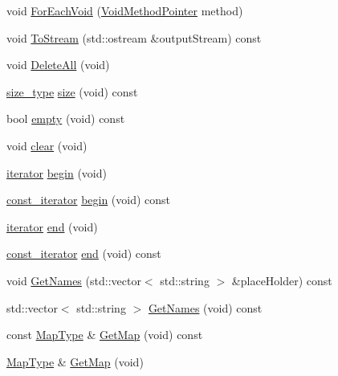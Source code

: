 \begin{DoxyCompactItemize}
\item 
void \hyperlink{classcmn_named_map_ae0a0c6bec0c43bd152aa29b396a7dccb}{For\-Each\-Void} (\hyperlink{classcmn_named_map_a00103a8e6e3c75f6eeabcc3a0657521c}{Void\-Method\-Pointer} method)
\item 
void \hyperlink{classcmn_named_map_a1082cdd551da4064ac01d1687bf91bf2}{To\-Stream} (std\-::ostream \&output\-Stream) const 
\item 
void \hyperlink{classcmn_named_map_a7b4699c7d3e7bcda36f0d5f3615a9594}{Delete\-All} (void)
\item 
\hyperlink{classcmn_named_map_aaaf5963f1e9b26efb08e7f0cd7199335}{size\-\_\-type} \hyperlink{classcmn_named_map_a5c545600ff58364bef71df804078378f}{size} (void) const 
\item 
bool \hyperlink{classcmn_named_map_a6f8ee322e0cef9aa6841dfe4e9b51b0b}{empty} (void) const 
\item 
void \hyperlink{classcmn_named_map_ab1bb56227b49802271d395b99af72bcb}{clear} (void)
\item 
\hyperlink{classcmn_named_map_a0ad463b349c3c95e8f639e12f492765e}{iterator} \hyperlink{classcmn_named_map_a1161a0e7eaaf2b34cd6747f29e9f52d7}{begin} (void)
\item 
\hyperlink{classcmn_named_map_a94a2be09d6678944e3a330c641d69d41}{const\-\_\-iterator} \hyperlink{classcmn_named_map_aefff0d0c751cf9fee634b95bd796abcd}{begin} (void) const 
\item 
\hyperlink{classcmn_named_map_a0ad463b349c3c95e8f639e12f492765e}{iterator} \hyperlink{classcmn_named_map_a593995b97e2051fb19a53ba3d27fd207}{end} (void)
\item 
\hyperlink{classcmn_named_map_a94a2be09d6678944e3a330c641d69d41}{const\-\_\-iterator} \hyperlink{classcmn_named_map_a5c0a21bb49e60dfd6c585ce3c3406bf4}{end} (void) const 
\end{DoxyCompactItemize}
{\bf }\par
\begin{DoxyCompactItemize}
\item 
void \hyperlink{classcmn_named_map_aa606927a1fb85df463d2148200923f40}{Get\-Names} (std\-::vector$<$ std\-::string $>$ \&place\-Holder) const 
\item 
std\-::vector$<$ std\-::string $>$ \hyperlink{classcmn_named_map_a4748c784451cca8eda41a7959b71f434}{Get\-Names} (void) const 
\end{DoxyCompactItemize}

{\bf }\par
\begin{DoxyCompactItemize}
\item 
const \hyperlink{classcmn_named_map_a35919ad9cccf3e060063b489db663425}{Map\-Type} \& \hyperlink{classcmn_named_map_a10b7d4cf884a7b5cb44aeb7133452049}{Get\-Map} (void) const 
\item 
\hyperlink{classcmn_named_map_a35919ad9cccf3e060063b489db663425}{Map\-Type} \& \hyperlink{classcmn_named_map_a2e819ccf5448f3b47f50246e61f5b453}{Get\-Map} (void)
\end{DoxyCompactItemize}

